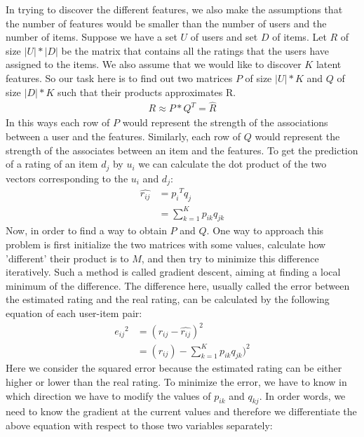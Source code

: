 In trying to discover the different features, we also make the assumptions that the number of features would be smaller than the number of users and the number of items. Suppose we have a set $U$ of users and set $D$ of items. Let $R$ of size $|U| * |D| $ be the matrix that contains all the ratings that the users have assigned to the items. We also assume that we would like to discover $K$ latent features. So our task here is to find out two matrices $P$ of size $|U| * K$ and $Q$ of size ${|D| * K}$ such that their products approximates R.
\begin{equation}
\begin{split}
	R \approx P*Q^T = \widehat{R}
\end{split}
\end{equation}
In this ways each row of $P$ would represent the strength of the associations between a user and the features. Similarly, each row of $Q$ would represent the strength of the associates between an item and the features. To get the prediction of a rating of an item $d_j$ by $u_i$ we can calculate the dot product of the two vectors corresponding to the $u_i$ and $d_j$:
\begin{equation}
\begin{split}
	\widehat{r_{ij}} & = {p_i}^Tq_j \\
	 & = {\sum_{k=1}^K} p_{ik}q_{jk}
\end{split}
\end{equation}
Now, in order to find a way to obtain $P$ and $Q$. One way to approach this problem is first initialize the two matrices with some values, calculate how 'different' their product is to $M$, and then try to minimize this difference iteratively. Such a method is called gradient descent, aiming at finding a local minimum of the difference. The difference here, usually called the error between the estimated rating and the real rating, can be calculated by the following equation of each user-item pair:
\begin{equation}
\begin{split}
	{e_{ij}}^2 & = (r_{ij} - \widehat{r_{ij}})^2 \\ 
	& = (r_{ij}) - {\sum_{k=1}^K} p_{ik}q_{jk})^2
\end{split}
\end{equation}
Here we consider the squared error because the estimated rating can be either higher or lower than the real rating.
To minimize the error, we have to know in which direction we have to modify the values of $p_{ik}$ and $q_{kj}$. In order words, we need to know the gradient at the current values and therefore we differentiate the above equation with respect to those two variables separately:
